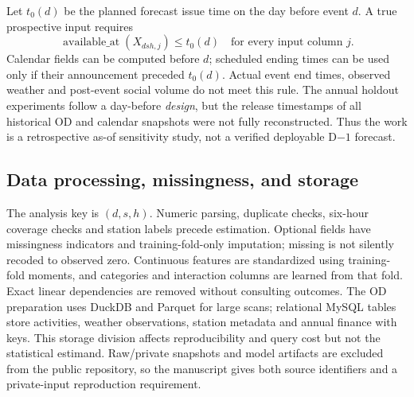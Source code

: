 Let $t_0(d)$ be the planned forecast issue time on the day before event $d$. A true prospective input requires
\begin{equation}
\operatorname{available\_at}(X_{dsh,j})\leq t_0(d)
\quad\text{for every input column }j.
\label{eq:frontier}
\end{equation}
Calendar fields can be computed before $d$; scheduled ending times can be used only if their announcement preceded $t_0(d)$. Actual event end times, observed weather and post-event social volume do not meet this rule. The annual holdout experiments follow a day-before \emph{design}, but the release timestamps of all historical OD and calendar snapshots were not fully reconstructed. Thus the work is a retrospective as-of sensitivity study, not a verified deployable D$-1$ forecast.

\subsection{Data processing, missingness, and storage}
The analysis key is $(d,s,h)$. Numeric parsing, duplicate checks, six-hour coverage checks and station labels precede estimation. Optional fields have missingness indicators and training-fold-only imputation; missing is not silently recoded to observed zero. Continuous features are standardized using training-fold moments, and categories and interaction columns are learned from that fold. Exact linear dependencies are removed without consulting outcomes. The OD preparation uses DuckDB and Parquet for large scans; relational MySQL tables store activities, weather observations, station metadata and annual finance with keys. This storage division affects reproducibility and query cost but not the statistical estimand. Raw/private snapshots and model artifacts are excluded from the public repository, so the manuscript gives both source identifiers and a private-input reproduction requirement.
